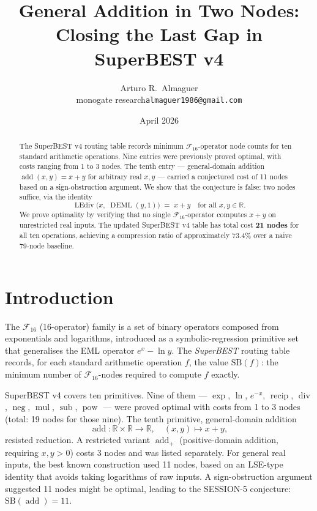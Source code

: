 \documentclass[12pt,a4paper]{article}
\title{General Addition in Two Nodes:\\
       Closing the Last Gap in SuperBEST v4}
\author{Arturo R.\ Almaguer\\
  \small monogate research\quad\texttt{almaguer1986@gmail.com}}
\date{April 2026}
\theoremstyle{definition}
\newcommand{\DEML}{\operatorname{DEML}}
\newcommand{\LEdiv}{\operatorname{LEdiv}}
\newcommand{\recip}{\operatorname{recip}}
\newcommand{\divop}{\operatorname{div}}
\newcommand{\mulop}{\operatorname{mul}}
\newcommand{\subop}{\operatorname{sub}}
\newcommand{\addop}{\operatorname{add}}
\newcommand{\negop}{\operatorname{neg}}
\newcommand{\powop}{\operatorname{pow}}
\newcommand{\SB}{\mathrm{SB}}
\newcommand{\F}{\mathcal{F}_{16}}
\newcommand{\R}{\mathbb{R}}
\begin{document}
\maketitle

\begin{abstract}
The SuperBEST v4 routing table records minimum $\mathcal{F}_{16}$-operator node
counts for ten standard arithmetic operations.
Nine entries were previously proved optimal, with costs ranging from 1 to 3 nodes.
The tenth entry --- general-domain addition $\addop(x,y) = x+y$ for arbitrary
real $x, y$ --- carried a conjectured cost of 11 nodes based on a sign-obstruction
argument.
We show that the conjecture is false: two nodes suffice, via the identity
\[
  \LEdiv\!\bigl(x,\;\DEML(y,1)\bigr) \;=\; x + y
  \quad\text{for all }x, y \in \R.
\]
We prove optimality by verifying that no single $\F$-operator computes $x+y$
on unrestricted real inputs.
The updated SuperBEST v4 table has total cost \textbf{21 nodes} for all ten
operations, achieving a compression ratio of approximately 73.4\% over a
naive 79-node baseline.
\end{abstract}

\section{Introduction}
\label{sec:intro}

The $\F$ (16-operator) family is a set of binary operators composed from
exponentials and logarithms, introduced as a symbolic-regression primitive set
that generalises the EML operator $e^x - \ln y$.
The \emph{SuperBEST} routing table records, for each standard arithmetic
operation $f$, the value $\SB(f)$: the minimum number of $\F$-nodes required
to compute $f$ exactly.

SuperBEST v4 covers ten primitives.
Nine of them --- $\exp$, $\ln$, $e^{-x}$, $\recip$, $\divop$, $\negop$,
$\mulop$, $\subop$, $\powop$ --- were proved optimal with costs from 1 to 3
nodes (total: 19 nodes for those nine).
The tenth primitive, general-domain addition
\[
  \addop \colon \R \times \R \to \R, \quad (x,y) \mapsto x+y,
\]
resisted reduction.
A restricted variant $\addop_{+}$ (positive-domain addition, requiring $x,y > 0$)
costs 3 nodes and was listed separately.
For general real inputs, the best known construction used 11 nodes,
based on an LSE-type identity that avoids taking logarithms of raw inputs.
A sign-obstruction argument suggested 11 nodes might be optimal, leading to
the SESSION-5 conjecture: $\SB(\addop) = 11$.
\end{document}
